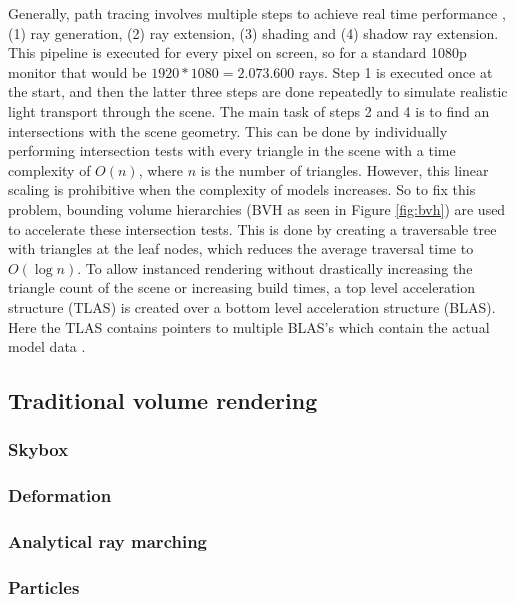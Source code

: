 Generally, path tracing involves multiple steps to achieve real time performance \cite{laine2013megakernels}, (1) ray generation, (2) ray extension, (3) shading and (4) shadow ray extension. This pipeline is executed for every pixel on screen, so for a standard 1080p monitor that would be $1920*1080=2.073.600$ rays. Step 1 is executed once at the start, and then the latter three steps are done repeatedly to simulate realistic light transport through the scene. The main task of steps 2 and 4 is to find an intersections with the scene geometry. This can be done by individually performing intersection tests with every triangle in the scene with a time complexity of $O(n)$, where $n$ is the number of triangles. However, this linear scaling is prohibitive when the complexity of models increases. So to fix this problem, bounding volume hierarchies (BVH as seen in Figure \ref{fig:bvh}) are used to accelerate these intersection tests. This is done by creating a traversable tree with triangles at the leaf nodes, which reduces the average traversal time to  $O(\log n)$. To allow instanced rendering without drastically increasing the triangle count of the scene or increasing build times, a top level acceleration structure (TLAS) is created over a bottom level acceleration structure (BLAS). Here the TLAS contains pointers to multiple BLAS's which contain the actual model data \cite{VulkanAccelerationStructures}.





\subsection{Traditional volume rendering} \label{introduction:traditional_volume_rendering}
\subsubsection{Skybox} \label{introduction:traditional_volume_rendering:skybox}
\subsubsection{Deformation} \label{introduction:traditional_volume_rendering:deformation}
\subsubsection{Analytical ray marching} \label{introduction:traditional_volume_rendering:analytical_ray_marching}
\subsubsection{Particles} \label{introduction:traditional_volume_rendering:particles}

